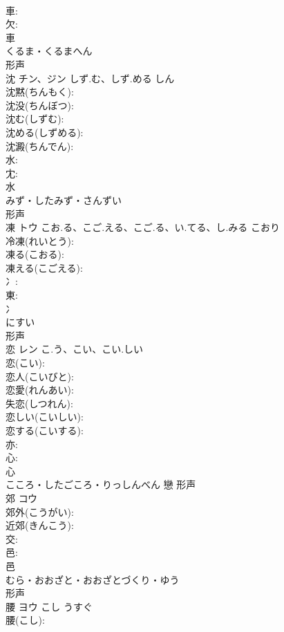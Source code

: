 \documentclass[8pt]{extreport}
\begin{document}
\begin{CJK}{UTF8}{min}
\\	車: 
\\	欠: 
\\	車	
\\	くるま・くるまへん	
\\	形声 
\\	沈	チン、ジン	しず.む、しず.める	しん	
\\	沈黙(ちんもく): 
\\	沈没(ちんぼつ): 
\\	沈む(しずむ): 
\\	沈める(しずめる): 
\\	沈澱(ちんでん): 
\\	水: 
\\	冘: 
\\	水	
\\	みず・したみず・さんずい	
\\	形声 
\\	凍	トウ	こお.る、こご.える、こご.る、い.てる、し.みる	こおり	
\\	冷凍(れいとう): 
\\	凍る(こおる): 
\\	凍える(こごえる): 
\\	冫: 
\\	東: 
\\	冫	
\\	にすい	
\\	形声 
\\	恋	レン	こ.う、こい、こい.しい		
\\	恋(こい): 
\\	恋人(こいびと): 
\\	恋愛(れんあい): 
\\	失恋(しつれん): 
\\	恋しい(こいしい): 
\\	恋する(こいする): 
\\	亦: 
\\	心: 
\\	心	
\\	こころ・したごころ・りっしんべん	戀	形声 
\\	郊	コウ			
\\	郊外(こうがい): 
\\	近郊(きんこう): 
\\	交: 
\\	邑: 
\\	邑	
\\	むら・おおざと・おおざとづくり・ゆう	
\\	形声 
\\	腰	ヨウ	こし	うすぐ	
\\	腰(こし): 

\end{CJK}
\end{document}
